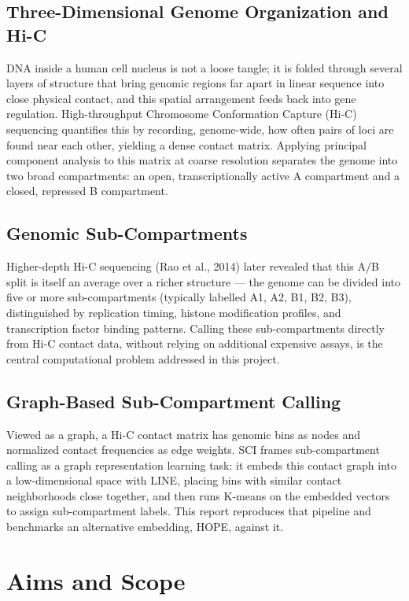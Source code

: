 \documentclass[12pt]{article}
\begin{document}
\subsection{Three-Dimensional Genome Organization and Hi-C}
DNA inside a human cell nucleus is not a loose tangle; it is folded through several layers of
structure that bring genomic regions far apart in linear sequence into close physical contact,
and this spatial arrangement feeds back into gene regulation. High-throughput Chromosome
Conformation Capture (Hi-C) sequencing quantifies this by recording, genome-wide, how often
pairs of loci are found near each other, yielding a dense contact matrix. Applying principal
component analysis to this matrix at coarse resolution separates the genome into two broad
compartments: an open, transcriptionally active A compartment and a closed, repressed
B compartment.

\subsection{Genomic Sub-Compartments}
Higher-depth Hi-C sequencing (Rao et al., 2014) later revealed that this A/B split is itself an
average over a richer structure — the genome can be divided into five or more sub-compartments
(typically labelled A1, A2, B1, B2, B3), distinguished by replication timing, histone modification
profiles, and transcription factor binding patterns. Calling these sub-compartments directly from
Hi-C contact data, without relying on additional expensive assays, is the central computational
problem addressed in this project.

\subsection{Graph-Based Sub-Compartment Calling}
Viewed as a graph, a Hi-C contact matrix has genomic bins as nodes and normalized contact
frequencies as edge weights. SCI frames sub-compartment calling as a graph representation
learning task: it embeds this contact graph into a low-dimensional space with LINE, placing bins
with similar contact neighborhoods close together, and then runs K-means on the embedded
vectors to assign sub-compartment labels. This report reproduces that pipeline and benchmarks
an alternative embedding, HOPE, against it.

\section{Aims and Scope}
\end{document}
